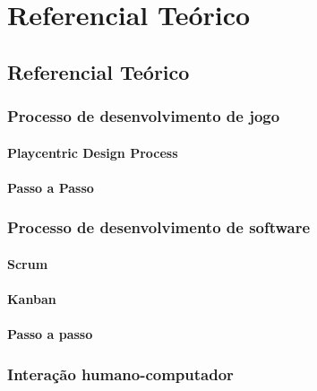 \part{Referencial Teórico}

\chapter[Referencial Teórico]{Referencial Teórico}



\section{Processo de desenvolvimento de jogo}



\subsection{Playcentric Design Process}



\subsection{Passo a Passo}



\section{Processo de desenvolvimento de software}



\subsection{Scrum}



\subsection{Kanban}



\subsection{Passo a passo}



\section{Interação humano-computador}



